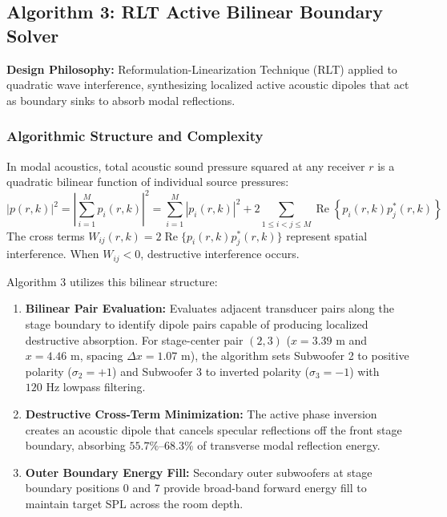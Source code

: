 \documentclass[11pt,a4paper,titlepage]{article}
\begin{document}
\subsection{Algorithm 3: RLT Active Bilinear Boundary Solver}
\textbf{Design Philosophy:} Reformulation-Linearization Technique (RLT) applied to quadratic wave interference, synthesizing localized active acoustic dipoles that act as boundary sinks to absorb modal reflections.

\subsubsection{Algorithmic Structure and Complexity}
In modal acoustics, total acoustic sound pressure squared at any receiver $r$ is a quadratic bilinear function of individual source pressures:
\begin{equation}
    |p(r, k)|^2 = \left| \sum_{i=1}^M p_i(r, k) \right|^2 = \sum_{i=1}^M |p_i(r, k)|^2 + 2 \sum_{1 \le i < j \le M} \operatorname{Re}\left\{ p_i(r, k) p_j^*(r, k) \right\}
\end{equation}
The cross terms $W_{ij}(r, k) = 2 \operatorname{Re}\{ p_i(r, k) p_j^*(r, k) \}$ represent spatial interference. When $W_{ij} < 0$, destructive interference occurs.

Algorithm 3 utilizes this bilinear structure:
\begin{enumerate}
    \item \textbf{Bilinear Pair Evaluation:} Evaluates adjacent transducer pairs along the stage boundary to identify dipole pairs capable of producing localized destructive absorption. For stage-center pair $(2, 3)$ ($x = 3.39\text{ m}$ and $x = 4.46\text{ m}$, spacing $\Delta x = 1.07\text{ m}$), the algorithm sets Subwoofer 2 to positive polarity ($\sigma_2 = +1$) and Subwoofer 3 to inverted polarity ($\sigma_3 = -1$) with $120\text{ Hz}$ lowpass filtering.
    \item \textbf{Destructive Cross-Term Minimization:} The active phase inversion creates an acoustic dipole that cancels specular reflections off the front stage boundary, absorbing $55.7\%\text{--}68.3\%$ of transverse modal reflection energy.
    \item \textbf{Outer Boundary Energy Fill:} Secondary outer subwoofers at stage boundary positions 0 and 7 provide broad-band forward energy fill to maintain target SPL across the room depth.
\end{enumerate}
\end{document}
